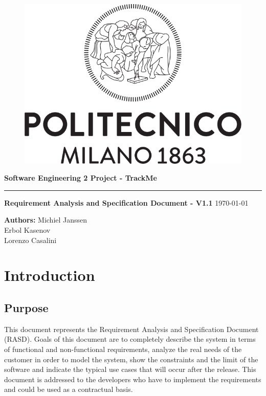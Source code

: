 \documentclass[12pt]{article}
\begin{document}
\begin{titlepage}
    \begin{center}
    \begin{figure}
        \centering
        \includegraphics[scale=0.2]{logoPolimi.png}
        \vspace{1.5cm}
    \end{figure}

    \Huge\textbf{Software Engineering 2 Project - TrackMe}
    \rule{12cm}{0.5pt}
    \Huge\textbf{Requirement Analysis and Specification Document - V1.1}
    \today
    \end{center}
    
    \vspace{3cm}
    
    \begin{flushleft}
        \LARGE\textbf{Authors: }
        \newline\newline
        \Large\texttt{}{Michiel Janssen \\ Erbol Kasenov \\ Lorenzo Casalini}
    \end{flushleft}
\end{titlepage}

\newpage
  \tableofcontents
\newpage

\section{Introduction}
\subsection{Purpose}
This document represents the Requirement Analysis and Specification Document (RASD). Goals of this document are to completely describe the system in terms of functional and non-functional requirements, analyze the real needs of the customer in order to model the system, show the constraints and the limit of the software and indicate the typical use cases that will occur after the release. This document is addressed to the developers who have to implement the requirements and could be used as a contractual basis.
\end{document}
